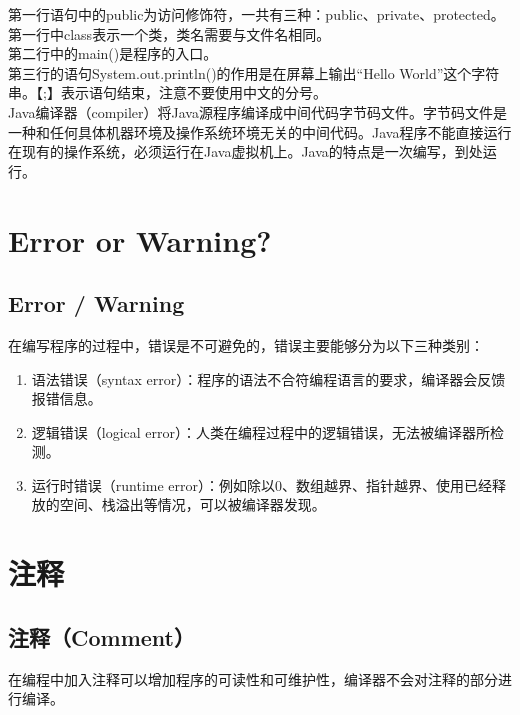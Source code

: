 第一行语句中的public为访问修饰符，一共有三种：public、private、protected。第一行中class表示一个类，类名需要与文件名相同。\\

第二行中的main()是程序的入口。\\

第三行的语句System.out.println()的作用是在屏幕上输出“Hello World”这个字符串。【;】表示语句结束，注意不要使用中文的分号。\\

Java编译器（compiler）将Java源程序编译成中间代码字节码文件。字节码文件是一种和任何具体机器环境及操作系统环境无关的中间代码。Java程序不能直接运行在现有的操作系统，必须运行在Java虚拟机上。Java的特点是一次编写，到处运行。

\newpage

\section{Error or Warning?}

\subsection{Error / Warning}

在编写程序的过程中，错误是不可避免的，错误主要能够分为以下三种类别：

\begin{enumerate}
	\item 语法错误（syntax error）：程序的语法不合符编程语言的要求，编译器会反馈报错信息。

	\item 逻辑错误（logical error）：人类在编程过程中的逻辑错误，无法被编译器所检测。

	\item 运行时错误（runtime error）：例如除以0、数组越界、指针越界、使用已经释放的空间、栈溢出等情况，可以被编译器发现。
\end{enumerate}

\newpage

\section{注释}

\subsection{注释（Comment）}

在编程中加入注释可以增加程序的可读性和可维护性，编译器不会对注释的部分进行编译。\\

